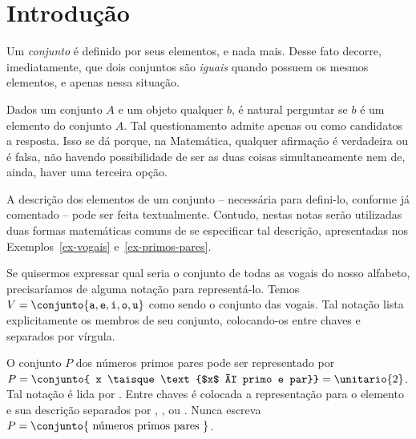 \section{Introdução}
\label{sec:intro}

Um \emph{conjunto} é definido por seus elementos, e nada mais.
Desse fato decorre, imediatamente, que dois conjuntos são \emph{iguais} quando possuem os mesmos elementos, e apenas nessa situação. 

Dados um conjunto $A$ e um objeto qualquer $b$, é natural perguntar se $b$ é um elemento do conjunto $A$. Tal questionamento admite apenas  ou  como candidatos a resposta. Isso se dá porque, na Matemática, qualquer afirmação é verdadeira ou é falsa, não havendo possibilidade de ser as duas coisas simultaneamente nem de, ainda, haver uma terceira opção. 


A descrição dos elementos de um conjunto -- necessária para defini-lo, conforme já comentado -- pode ser feita textualmente. Contudo, nestas notas serão utilizadas duas formas matemáticas comuns de se especificar tal descrição, apresentadas nos Exemplos~\ref{ex-vogais} e~\ref{ex-primos-pares}. 

\begin{example}
    \label{ex-vogais}
    Se quisermos expressar qual seria o conjunto de todas as vogais do nosso alfabeto, precisaríamos de alguma notação para representá-lo. Temos $V = \conjunto{\texttt a, \texttt e, \texttt i, \texttt o, \texttt u}$ como sendo o conjunto das vogais. Tal notação lista explicitamente os membros de seu conjunto, colocando-os entre chaves e separados por vírgula.
\end{example}

\begin{example}
    \label{ex-primos-pares}
    O conjunto $P$ dos números primos pares pode ser representado por $P = \conjunto{ x \taisque \text{$x$ é primo e par}} = \unitario{2}$. Tal notação é lida por . Entre chaves é colocada a representação para o elemento e sua descrição separados por \entreaspas{;}, \entreaspas{\contrabarra}, ou \entreaspas{|}.  Nunca escreva $P = \conjunto{\text{ números primos pares }}$.
\end{example}
